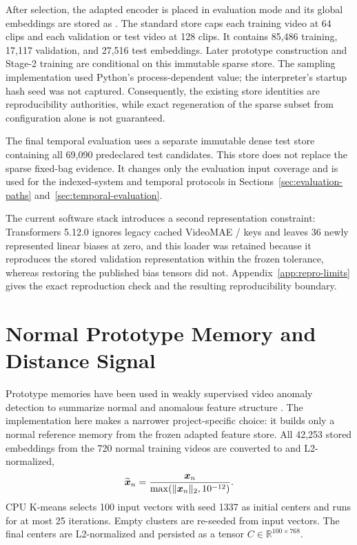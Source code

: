 After selection, the adapted encoder is placed in evaluation mode and its global embeddings are stored as . The standard store caps each training video at 64 clips and each validation or test video at 128 clips. It contains 85,486 training, 17,117 validation, and 27,516 test embeddings. Later prototype construction and Stage-2 training are conditional on this immutable sparse store. The sampling implementation used Python's process-dependent  value; the interpreter's startup hash seed was not captured. Consequently, the existing store identities are reproducibility authorities, while exact regeneration of the sparse subset from configuration alone is not guaranteed.

The final temporal evaluation uses a separate immutable dense test store containing all 69,090 predeclared test candidates. This store does not replace the sparse fixed-bag evidence. It changes only the evaluation input coverage and is used for the indexed-system and temporal protocols in Sections~\ref{sec:evaluation-paths} and~\ref{sec:temporal-evaluation}.

The current software stack introduces a second representation constraint: Transformers 5.12.0 ignores legacy cached VideoMAE / keys and leaves 36 newly represented linear biases at zero, and this loader was retained because it reproduces the stored validation representation within the frozen tolerance, whereas restoring the published bias tensors did not. Appendix~\ref{app:repro-limits} gives the exact reproduction check and the resulting reproducibility boundary.

\section{Normal Prototype Memory and Distance Signal}
\label{sec:prototype-teacher}

Prototype memories have been used in weakly supervised video anomaly detection to summarize normal and anomalous feature structure \cite{zhou2023ur}. The implementation here makes a narrower project-specific choice: it builds only a normal reference memory from the frozen adapted feature store. All 42,253 stored embeddings from the 720 normal training videos are converted to  and L2-normalized,
\begin{equation}
    \widetilde{\boldsymbol{x}}_n
    =\frac{\boldsymbol{x}_n}{\max(\lVert\boldsymbol{x}_n\rVert_2,10^{-12})}.
\end{equation}
CPU K-means \cite{lloyd1982least} selects 100 input vectors with seed 1337 as initial centers and runs for at most 25 iterations. Empty clusters are re-seeded from input vectors. The final centers are L2-normalized and persisted as a  tensor $C\in\mathbb{R}^{100\times768}$.

